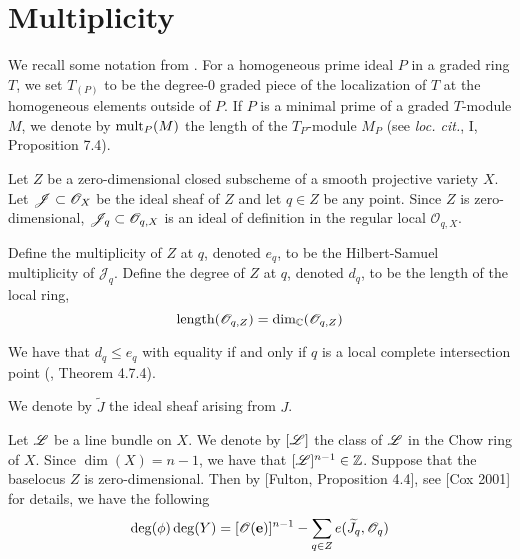 \documentclass[fleqn,reqno]{amsart}
\numberwithin{first}{chapter}
\begin{document}
\section{Multiplicity}

\begin{paragraf}
\label{par:mult-ha}
We recall some notation from \cite{Har-book-77}. For a homogeneous
prime ideal $P$ in a graded ring $T$, we set $T_{(P)}$ to be the degree-0 graded piece of the localization
of $T$ at the homogeneous elements outside of $P$. If $P$ is a minimal prime of a graded $T$-module
$M$, we denote by $\operatorname{mult}_P(M)$ the length of the $T_P$-module $M_P$ (see {\em loc. cit.}, I, Proposition 7.4).
\end{paragraf}

\begin{paragraf}
\label{par:mult}
Let $Z$ be a zero-dimensional closed subscheme of a smooth projective variety $X$.
Let $\mathscr{J}\subset\mathscr{O}_X$ be the ideal sheaf of $Z$
and let $q\in Z$ be any point.
Since $Z$ is zero-dimensional, $\mathscr{J}_q\subset\mathscr{O}_{q,X}$ is an ideal of definition
in the regular local $\mathscr{O}_{q,X}$.

Define the multiplicity of $Z$ at $q$, denoted $e_q$,
to be the Hilbert-Samuel multiplicity of $\mathscr{J}_q$.
Define the degree of $Z$ at $q$, denoted $d_q$, to be the length of the local ring,
\[	
	\operatorname{length}(\mathscr{O}_{q,Z})=\dim_{\mathbb{C}}(\mathscr{O}_{q,Z})
\]

We have that $d_q\leq e_q$ with equality if and only if $q$ is a local complete intersection
point (\citet{BH-98-CMrings}, Theorem 4.7.4).
\end{paragraf}

\begin{paragraf}
We denote by $\widetilde{J}$ the ideal sheaf arising from $J$.
\end{paragraf}

\begin{paragraf}
Let $\mathscr{L}$ be a line bundle on $X$.
We denote by $[\mathscr{L}]$ the class of $\mathscr{L}$ in the Chow ring of $X$.
Since $\dim(X)=n-1$, we have that $[\mathscr{L}]^{n-1}\in\mathbb{Z}$.
Suppose that the baselocus $Z$ is zero-dimensional.
Then by [Fulton, Proposition 4.4], see [Cox 2001] for details,
we have the following
\begin{align}
	\label{eq:degree-formula}
	\deg(\phi)\deg(Y)=[\mathscr{O}(\mathbf e)]^{n-1}-\sum_{q\in Z}e(\widetilde{J}_q,\mathscr{O}_q)
\end{align}
\end{paragraf}
\end{document}
